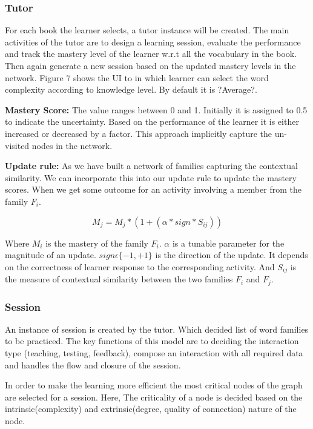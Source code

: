 \documentclass[11pt,a4paper]{article}
\begin{document}
\subsubsection{Tutor}
For each book the learner selects, a tutor instance will be created. The main
activities of the tutor are to design a learning session, evaluate the
performance and track the mastery level of the learner w.r.t all the vocabulary
in the book. Then again generate a new session based on the updated mastery
levels in the network. Figure 7 shows the UI to in which learner can select the word 
complexity according to knowledge level. By default it is ?Average?.

\textbf{Mastery Score:} The value ranges between 0 and 1. Initially it is
assigned to 0.5 to indicate the uncertainty. Based on the performance of the
learner it is either increased or decreased by a factor. This approach implicitly
capture the un-visited nodes in the network.

\textbf{Update rule:} As we have built a network of families capturing the
contextual similarity. We can incorporate this into our update rule to update
the mastery scores. When we get some outcome for an activity involving a member
from the family ${F_i}$.

\begin{equation}
  M_j = M_j * (1 + (\alpha * sign * S_{ij}))
\end{equation}

Where ${M_i}$ is the mastery of the family ${F_i}$. ${\alpha}$ is a tunable parameter
for the magnitude of an update. ${sign \epsilon \{-1, +1\}}$ is the direction 
of the update. It depends on the correctness of learner response to the corresponding
activity. And ${S_{ij}}$ is the measure of contextual similarity between the two
families ${F_i}$ and ${F_j}$.

\subsubsection{Session}
An instance of session is created by the tutor. Which decided list of word
families to be practiced. The key functions of this model are to deciding the
interaction type (teaching, testing, feedback), compose an interaction with all
required data and handles the flow and closure of the session.

In order to make the learning more efficient the most critical nodes of the
graph are selected for a session. Here, The criticality of a node is decided
based on the intrinsic(complexity) and extrinsic(degree, quality of connection)
nature of the node.
\end{document}
